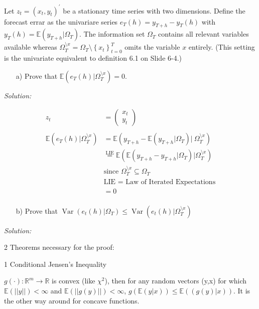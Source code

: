 \documentclass[12pt,a4paper]{article}
\newcommand{\Var}{\operatorname{Var}} %
\begin{document}
Let \(z_t = (x_t, y_t)^{'}\) be a stationary time series with two
dimensions. Define the forecast errar as the univariare series
\(e_T (h) = y_{T +h} - y_T (h)\) with
\(y_T (h) = \mathbb{E} \left( y_{T + h} | \Omega_T \right)\). The
information set \(\Omega_T\) contains all relevant variables available
whereas
\(\Omega^{\setminus x}_{T} = \Omega_T \setminus \left\{ x_t\right\}_{t = 0}^{T}\)
omits the variable \(x\) entirely. (This setting is the univariate
equivalent to definition 6.1 on Slide 6-4.)

\begin{itemize}
  \item[a)] Prove that $\mathbb{E} \left( e_T(h) | \Omega_{T}^{\setminus x} \right) = 0$.
\end{itemize}

\emph{Solution:}

\begin{align*}
  z_t & = \begin{pmatrix} x_t \\ y_t \end{pmatrix}\\
  \\
  \mathbb{E} \left( e_T (h) | \Omega_{T}^{\setminus x} \right) & = \mathbb{E} \left( y_{T + h} - \mathbb{E} \left( y_{T +h} | \Omega_T \right) | \ \Omega_{T}^{\setminus x} \right)\\
  & \overset{\text{LIE}}{=} \mathbb{E} \left( \mathbb{E} \left( y_{T +h} - y_{T + h}| \Omega_T \right) | \Omega_{T}^{\setminus x} \right)\\
  & \text{since } \Omega_{T}^{\setminus x} \subseteq \Omega_{T}  \\
  & \text{LIE = Law of Iterated Expectations}\\
  & = 0\\
\end{align*}

\begin{itemize}
  \item[b)] Prove that $\Var \left(e_t (h)| \Omega_T \right) \leq \Var \left(e_t (h)| \Omega_T^{\setminus x} \right)$
\end{itemize}

\emph{Solution:}

2 Theorems necessary for the proof:

1 Conditional Jensen's Inequality

\(g(\cdot ): \mathbb{R}^{m} \rightarrow \mathbb{R}\) is convex (like
\(\chi^2\)), then for any random vectors (y,x) for which
\(\mathbb{E} (||y||) < \infty\) and \(\mathbb{E} (|| g(y)||)< \infty\),
\(g \left( \mathbb{E} (y|x) \right) \leq \mathbb{E} \left( (g(y)|x) \right)\).
It is the other way around for concave functions.
\end{document}
